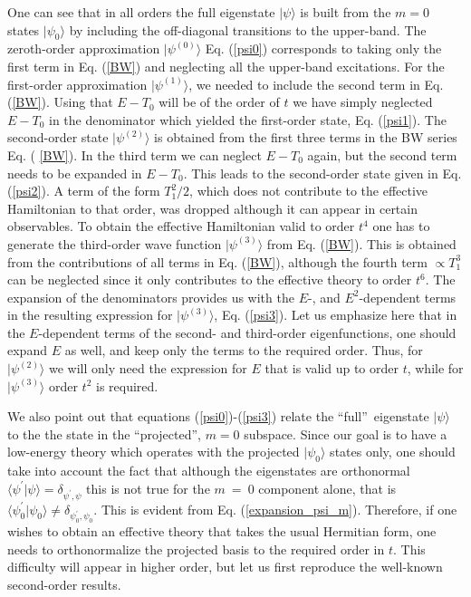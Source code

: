 \documentclass[floatfix,twocolumn,aps,prb,showpacs,superscriptaddress]{revtex4}
\def\tone{T_1}
\begin{document}
One can see that in all orders the full eigenstate $|\psi \rangle $ is built
from the $m=0$ states $|\psi _{0}\rangle $ by including the off-diagonal
transitions to the upper-band. The zeroth-order approximation $|\psi
^{(0)}\rangle $ Eq. (\ref{psi0}) corresponds to taking only the first term
in Eq. (\ref{BW}) and neglecting all the upper-band excitations. For the
first-order approximation $|\psi ^{(1)}\rangle $, we needed to include the
second term in Eq. (\ref{BW}). Using that $E-T_{0}$ will be of the order of $%
t$ we have simply neglected $E-T_{0}$ in the denominator which yielded the
first-order state, Eq. (\ref{psi1}). The second-order state $|\psi
^{(2)}\rangle $ is obtained from the first three terms in the BW series Eq. (%
\ref{BW}). In the third term we can neglect $E-T_{0}$ again, but the second
term needs to be expanded in $E-T_{0}$. This leads to the second-order state
given in Eq. (\ref{psi2}). A term of the form $\tone^2/2$, which does not
contribute to the effective Hamiltonian to that order, was dropped although
it can appear in certain observables. To obtain the effective Hamiltonian
valid to order $t^{4}$ one has to generate the third-order wave function $%
|\psi ^{(3)}\rangle $ from Eq. (\ref{BW}). This is obtained from the
contributions of all terms in Eq. (\ref{BW}), although the fourth term $%
\propto \tone^3$ can be neglected since it only contributes to the
effective theory to order $t^{6}$. The expansion of the denominators
provides us with the $E$-, and $E^{2}$-dependent terms in the resulting
expression for $|\psi ^{(3)}\rangle $, Eq. (\ref{psi3}). Let us emphasize
here that in the $E$-dependent terms of the second- and third-order
eigenfunctions, one should expand $E$ as well, and keep only the terms to
the required order. Thus, for $|\psi ^{(2)}\rangle $ we will only need the
expression for $E$ that is valid up to order $t$, while for $|\psi
^{(3)}\rangle $ order $t^{2}$ is required.


We also point out that equations (\ref{psi0})-(\ref{psi3}) relate the
\textquotedblleft full\textquotedblright\ eigenstate $|\psi \rangle $ to the
the state in the \textquotedblleft projected\textquotedblright , $m=0$
subspace. Since our goal is to have a low-energy theory which operates with
the projected $|\psi _{0}\rangle $ states only, one should take into account
the fact that although the eigenstates are orthonormal $\langle \psi
^{\prime }|\psi \rangle =\delta _{\psi ^{\prime },\psi }$ this is not true
for the $m~=~0$ component alone, that is $\langle \psi _{0}^{\prime }|\psi
_{0}\rangle \neq \delta _{\psi _{0}^{\prime },\psi _{0}}$. This is evident
from Eq. (\ref{expansion_psi_m}). Therefore, if one wishes to obtain an
effective theory that takes the usual Hermitian form, one needs to
orthonormalize the projected basis to the required order in $t$. This
difficulty will appear in higher order, but let us first reproduce the
well-known second-order results.
\end{document}

